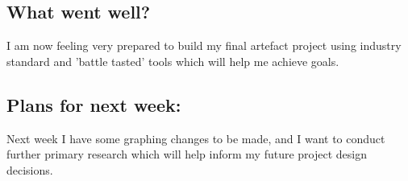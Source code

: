\subsection*{What went well?}

I am now feeling very prepared to build my final artefact project using industry standard and 'battle tasted' tools which will help me achieve goals.

\subsection*{Plans for next week:}

Next week I have some graphing changes to be made, and I want to conduct further primary research which will help inform my future project design decisions.
